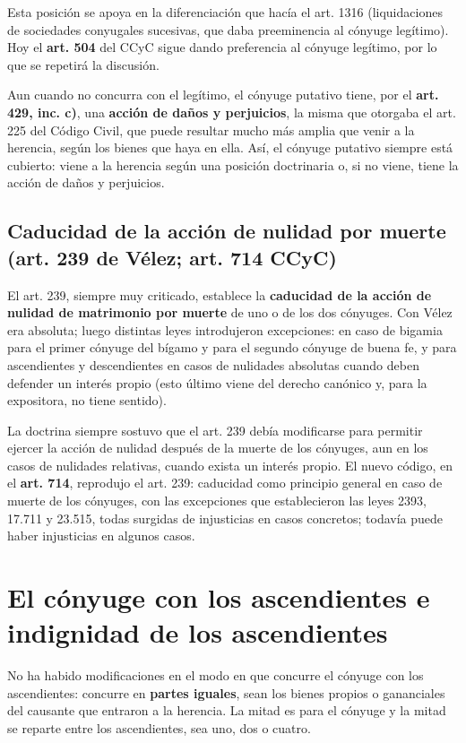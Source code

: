 \documentclass[12pt,oneside]{book}
\begin{document}
Esta posición se apoya en la diferenciación que hacía el art. 1316 (liquidaciones de sociedades conyugales sucesivas, que daba preeminencia al cónyuge legítimo). Hoy el \textbf{art. 504} del CCyC sigue dando preferencia al cónyuge legítimo, por lo que se repetirá la discusión.

Aun cuando no concurra con el legítimo, el cónyuge putativo tiene, por el \textbf{art. 429, inc. c)}, una \textbf{acción de daños y perjuicios}, la misma que otorgaba el art. 225 del Código Civil, que puede resultar mucho más amplia que venir a la herencia, según los bienes que haya en ella. Así, el cónyuge putativo siempre está cubierto: viene a la herencia según una posición doctrinaria o, si no viene, tiene la acción de daños y perjuicios.

\subsection{Caducidad de la acción de nulidad por muerte (art. 239 de Vélez; art. 714 CCyC)}

El art. 239, siempre muy criticado, establece la \textbf{caducidad de la acción de nulidad de matrimonio por muerte} de uno o de los dos cónyuges. Con Vélez era absoluta; luego distintas leyes introdujeron excepciones: en caso de bigamia para el primer cónyuge del bígamo y para el segundo cónyuge de buena fe, y para ascendientes y descendientes en casos de nulidades absolutas cuando deben defender un interés propio (esto último viene del derecho canónico y, para la expositora, no tiene sentido).

La doctrina siempre sostuvo que el art. 239 debía modificarse para permitir ejercer la acción de nulidad después de la muerte de los cónyuges, aun en los casos de nulidades relativas, cuando exista un interés propio. El nuevo código, en el \textbf{art. 714}, reprodujo el art. 239: caducidad como principio general en caso de muerte de los cónyuges, con las excepciones que establecieron las leyes 2393, 17.711 y 23.515, todas surgidas de injusticias en casos concretos; todavía puede haber injusticias en algunos casos.

\section{El cónyuge con los ascendientes e indignidad de los ascendientes}

No ha habido modificaciones en el modo en que concurre el cónyuge con los ascendientes: concurre en \textbf{partes iguales}, sean los bienes propios o gananciales del causante que entraron a la herencia. La mitad es para el cónyuge y la mitad se reparte entre los ascendientes, sea uno, dos o cuatro.
\end{document}
